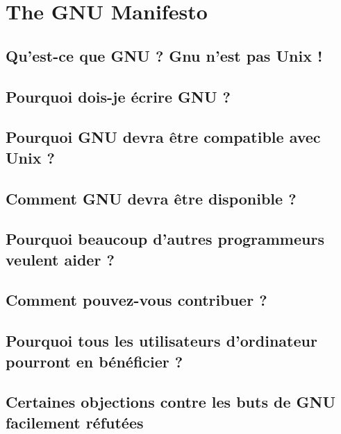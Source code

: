 \chapter{The GNU Manifesto}\label{TGM}
\section{Qu'est-ce que GNU ? Gnu n'est pas Unix !}\label{TGMsec1}
\section{Pourquoi dois-je écrire GNU ?}\label{TGMsec2}
\section{Pourquoi GNU devra être compatible avec Unix ?}\label{TGMsec3}
\section{Comment GNU devra être disponible ?}\label{TGMsec4}
\section{Pourquoi beaucoup d'autres programmeurs veulent aider
  ?}\label{TGMsec5} 
\section{Comment pouvez-vous contribuer ?}\label{TGMsec6}
\section{Pourquoi tous les utilisateurs d'ordinateur pourront en
  bénéficier ?}\label{TGMsec7}
\section{Certaines objections contre les buts de GNU facilement
  réfutées}\label{TGMsec8}  